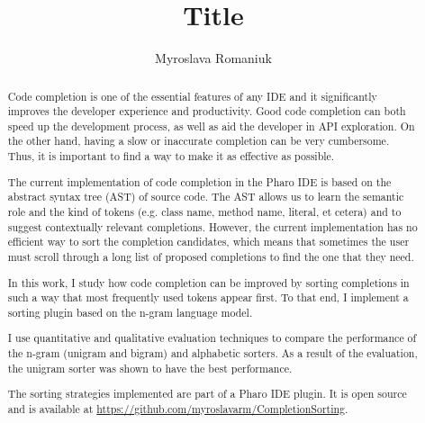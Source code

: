 \documentclass[sigplan,screen]{acmart}
\begin{document}
\title{Title}
\author{Myroslava Romaniuk}
\begin{abstract}
Code completion is one of the essential features of any IDE and it significantly improves the developer experience and productivity. Good code completion can both speed up the development process, as well as aid the developer in API exploration. On the other hand, having a slow or inaccurate completion can be very cumbersome. Thus, it is important to find a way to make it as effective as possible.

The current implementation of code completion in the Pharo IDE is based on the abstract syntax tree (AST) of source code. The AST allows us to learn the semantic role and the kind of tokens (e.g. class name, method name, literal, et cetera) and to suggest contextually relevant completions. However, the current implementation has no efficient way to sort the completion candidates, which means that sometimes the user must scroll through a long list of proposed completions to find the one that they need.

In this work, I study how code completion can be improved by sorting completions in such a way that most frequently used tokens appear first. To that end, I implement a sorting plugin based on the n-gram language model.

I use quantitative and qualitative evaluation techniques to compare the performance of the n-gram (unigram and bigram) and alphabetic sorters. As a result of the evaluation, the unigram sorter was shown to have the best performance.

The sorting strategies implemented are part of a Pharo IDE plugin. It is open source and is available at \url{https://github.com/myroslavarm/CompletionSorting}.
\end{abstract}

\maketitle
\end{document}
